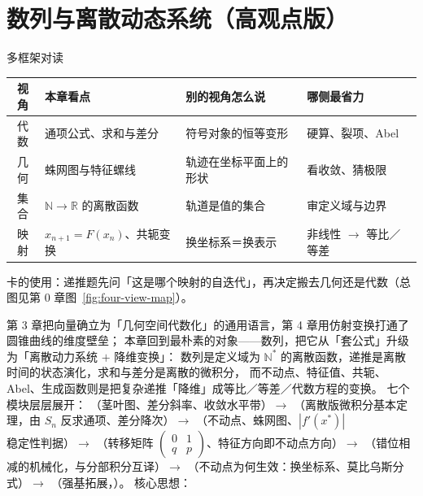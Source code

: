 
\section{数列与离散动态系统（高观点版）}

\begin{methodbox}{多框架对读}
\small
\begin{center}
\begin{tabular}{c|p{2.9cm}|p{5.0cm}|p{3.1cm}}
\toprule
视角 & 本章看点 & 别的视角怎么说 & 哪侧最省力 \\
\midrule
代数 & 通项公式、求和与差分 & 符号对象的恒等变形 & 硬算、裂项、Abel \\
几何 & 蛛网图与特征螺线 & 轨迹在坐标平面上的形状 & 看收敛、猜极限 \\
集合 & $\mathbb{N}\to\mathbb{R}$ 的离散函数 & 轨道是值的集合 & 审定义域与边界 \\
映射 & $x_{n+1}=F(x_n)$、共轭变换 & 换坐标系＝换表示 & 非线性 $\to$ 等比／等差 \\
\bottomrule
\end{tabular}
\end{center}
卡的使用：递推题先问「这是哪个映射的自迭代」，再决定搬去几何还是代数（总图见第 0 章图~\ref{fig:four-view-map}）。
\end{methodbox}

第 3 章把向量确立为「几何空间代数化」的通用语言，第 4 章用仿射变换打通了圆锥曲线的维度壁垒；
本章回到最朴素的对象——数列，把它从「套公式」升级为「离散动力系统 $+$ 降维变换」：
数列是定义域为 $\mathbb{N}^*$ 的离散函数，递推是离散时间的状态演化，求和与差分是离散的微积分，
而不动点、特征值、共轭、Abel、生成函数则是把复杂递推「降维」成等比／等差／代数方程的变换。
七个模块层层展开：
（茎叶图、差分斜率、收敛水平带）$\to$
（离散版微积分基本定理，由 $S_n$ 反求通项、差分降次）$\to$
（不动点、蛛网图、$|f'(x^*)|$ 稳定性判据）$\to$
（转移矩阵 $\begin{pmatrix}0&1\\q&p\end{pmatrix}$、特征方向即不动点方向）$\to$
（错位相减的机械化，与分部积分互译）$\to$
（不动点为何生效：换坐标系、莫比乌斯分式）$\to$
（强基拓展，）。
核心思想：


